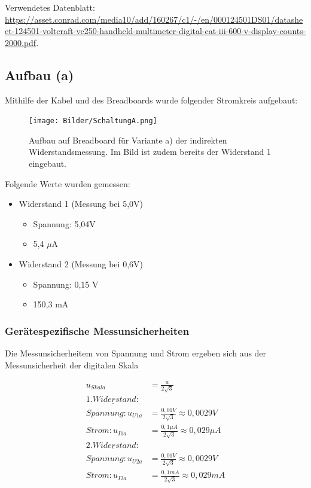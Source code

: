 \documentclass[
  9pt,
]{article}
\begin{document}
Verwendetes Datenblatt:
\url{https://asset.conrad.com/media10/add/160267/c1/-/en/000124501DS01/datasheet-124501-voltcraft-vc250-handheld-multimeter-digital-cat-iii-600-v-display-counts-2000.pdf}.

\hypertarget{aufbau-a}{%
\subsection{Aufbau (a)}\label{aufbau-a}}

Mithilfe der Kabel und des Breadboards wurde folgender Stromkreis
aufgebaut:

\begin{figure}
\centering
\texttt{[image: Bilder/SchaltungA.png]}
\caption{Aufbau auf Breadboard für Variante a) der indirekten
Widerstandsmessung. Im Bild ist zudem bereits der Widerstand 1
eingebaut.}
\end{figure}

Folgende Werte wurden gemessen:

\begin{itemize}
\item {Widerstand 1 (Messung bei 5,0V)}
\begin{itemize}
\item {Spannung: 5,04V}
\item {5,4 $\mu$A}
\end{itemize}
\item {Widerstand 2 (Messung bei 0,6V)}
\begin{itemize}
\item {Spannung: 0,15 V}
\item {150,3 mA}
\end{itemize}
\end{itemize}

\hypertarget{geruxe4tespezifische-messunsicherheiten}{%
\subsubsection{Gerätespezifische
Messunsicherheiten}\label{geruxe4tespezifische-messunsicherheiten}}

Die Messunsicherheitem von Spannung und Strom ergeben sich aus der
Messunsicherheit der digitalen Skala

\begin{equation*}
\begin{split}
u_{Skala} &=\frac{a}{2\sqrt{3}} \\
\underline{1.Widerstand:} \\
Spannung: u_{U1a} &= \frac{0,01V}{2\sqrt{3}} \approx 0,0029 V \\
Strom: u_{I1a} &= \frac{0,1\mu A}{2\sqrt{3}} \approx 0,029\mu A \\
\underline{2.Widerstand:} \\
Spannung: u_{U2a} &= \frac{0,01V}{2\sqrt{3}} \approx 0,0029 V \\
Strom: u_{I2a} &= \frac{0,1mA}{2\sqrt{3}} \approx 0,029 mA \\
\end{split}
\end{equation*}
\end{document}
